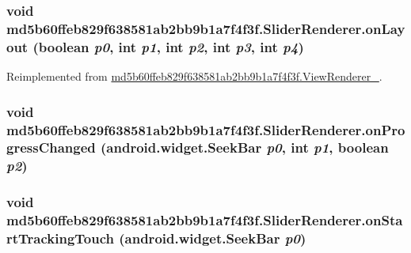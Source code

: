 \hypertarget{classmd5b60ffeb829f638581ab2bb9b1a7f4f3f_1_1_slider_renderer_fac38e4eaa408c22962aa4a88025b986}{
\subsubsection[{onLayout}]{\setlength{\rightskip}{0pt plus 5cm}void md5b60ffeb829f638581ab2bb9b1a7f4f3f.SliderRenderer.onLayout (boolean {\em p0}, \/  int {\em p1}, \/  int {\em p2}, \/  int {\em p3}, \/  int {\em p4})}}
\label{classmd5b60ffeb829f638581ab2bb9b1a7f4f3f_1_1_slider_renderer_fac38e4eaa408c22962aa4a88025b986}




Reimplemented from \hyperlink{classmd5b60ffeb829f638581ab2bb9b1a7f4f3f_1_1_view_renderer__2_0b758be41e41d3577cadf82bc8d004b6}{md5b60ffeb829f638581ab2bb9b1a7f4f3f.ViewRenderer\_}.\hypertarget{classmd5b60ffeb829f638581ab2bb9b1a7f4f3f_1_1_slider_renderer_8749343787854a49aedab1eb23f1b5fd}{
\subsubsection[{onProgressChanged}]{\setlength{\rightskip}{0pt plus 5cm}void md5b60ffeb829f638581ab2bb9b1a7f4f3f.SliderRenderer.onProgressChanged (android.widget.SeekBar {\em p0}, \/  int {\em p1}, \/  boolean {\em p2})}}
\label{classmd5b60ffeb829f638581ab2bb9b1a7f4f3f_1_1_slider_renderer_8749343787854a49aedab1eb23f1b5fd}


\hypertarget{classmd5b60ffeb829f638581ab2bb9b1a7f4f3f_1_1_slider_renderer_94e46916cabbb945547dd03b6915531b}{
\subsubsection[{onStartTrackingTouch}]{\setlength{\rightskip}{0pt plus 5cm}void md5b60ffeb829f638581ab2bb9b1a7f4f3f.SliderRenderer.onStartTrackingTouch (android.widget.SeekBar {\em p0})}}
\label{classmd5b60ffeb829f638581ab2bb9b1a7f4f3f_1_1_slider_renderer_94e46916cabbb945547dd03b6915531b}


